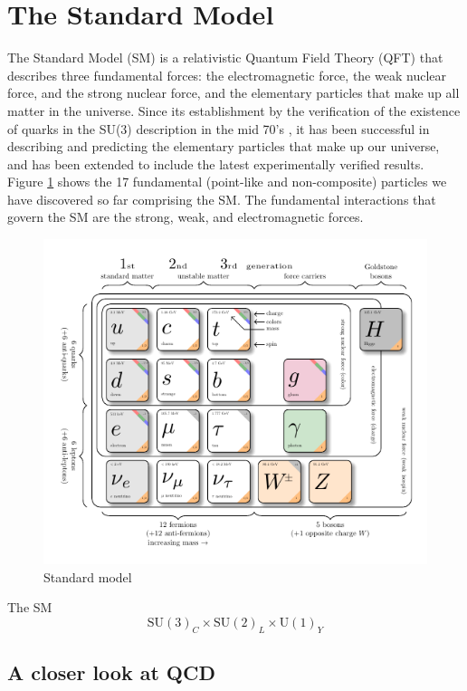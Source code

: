 \section{The Standard Model}\label{sec1:sm}
The Standard Model (SM) is a relativistic Quantum Field Theory (QFT) that describes three fundamental forces: the electromagnetic force, the weak nuclear force, and the strong nuclear force, and the elementary particles that make up all matter in the universe. Since its establishment by the verification of the existence of quarks in the SU(3) description in the mid 70's \cite{aitchisonhey}, it has been successful in describing and predicting the elementary particles that make up our universe, and has been extended to include the latest experimentally verified results. Figure \ref{fig:SMtikz} shows the 17 fundamental (point-like and non-composite) particles we have discovered so far comprising the SM. The fundamental interactions that govern the SM are the strong, weak, and electromagnetic forces.
\begin{figure}
    \centering
    \includegraphics[width=\linewidth]{figures/SMtikz (2).pdf}
    \caption{Standard model}
    \label{fig:SMtikz}
\end{figure}
The SM 
\begin{equation}
\text{SU}(3)_C \times \text{SU}(2)_L \times \text{U}(1)_Y
\end{equation}
\subsection{A closer look at QCD}\label{sec1.1:ch1:QCD}
